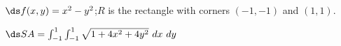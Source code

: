 {$\ds f(x,y) = x^2-y^2$;\quad $R$ is the rectangle with corners $(-1,-1)$ and $(1,1)$.

}
{$\ds SA = \int_{-1}^{1}\int_{-1}^{1} \sqrt{1+ 4x^2+4y^2}\ dx\ dy$
}